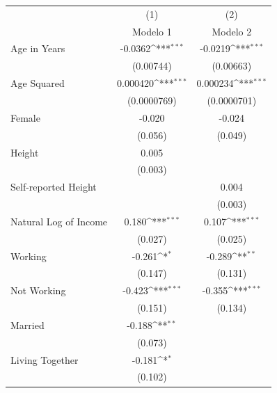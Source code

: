 {
\def\sym#1{\ifmmode^{#1}\else\(^{#1}\)\fi}
\begin{tabular}{l*{2}{c}}
\toprule
                    &\multicolumn{1}{c}{(1)}&\multicolumn{1}{c}{(2)}\\
                    &\multicolumn{1}{c}{Modelo 1}&\multicolumn{1}{c}{Modelo 2}\\
\midrule
Age in Years        &     -0.0362\sym{***}&     -0.0219\sym{***}\\
                    &   (0.00744)         &   (0.00663)         \\
\addlinespace
Age Squared         &    0.000420\sym{***}&    0.000234\sym{***}\\
                    & (0.0000769)         & (0.0000701)         \\
\addlinespace
Female              &      -0.020         &      -0.024         \\
                    &     (0.056)         &     (0.049)         \\
\addlinespace
Height              &       0.005         &                     \\
                    &     (0.003)         &                     \\
\addlinespace
Self-reported Height&                     &       0.004         \\
                    &                     &     (0.003)         \\
\addlinespace
Natural Log of Income&       0.180\sym{***}&       0.107\sym{***}\\
                    &     (0.027)         &     (0.025)         \\
\addlinespace
Working             &      -0.261\sym{*}  &      -0.289\sym{**} \\
                    &     (0.147)         &     (0.131)         \\
\addlinespace
Not Working         &      -0.423\sym{***}&      -0.355\sym{***}\\
                    &     (0.151)         &     (0.134)         \\
\addlinespace
Married             &      -0.188\sym{**} &                     \\
                    &     (0.073)         &                     \\
\addlinespace
Living Together     &      -0.181\sym{*}  &                     \\
                    &     (0.102)         &                     \\

\end{tabular}}
